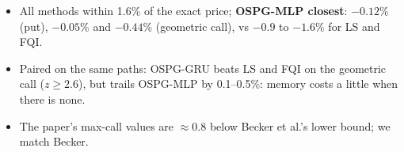 \begin{itemize}\small
\item All methods within 1.6\% of the exact price; \textbf{OSPG-MLP closest}:
  $-0.12\%$ (put), $-0.05\%$ and $-0.44\%$ (geometric call), vs $-0.9$ to $-1.6\%$ for LS and FQI.
\item Paired on the same paths: OSPG-GRU beats LS and FQI on the geometric call ($z\ge2.6$),
  but trails OSPG-MLP by 0.1--0.5\%: memory costs a little when there is none.
\item The paper's max-call values are $\approx0.8$ below Becker et al.'s lower bound; we match Becker.
\end{itemize}
